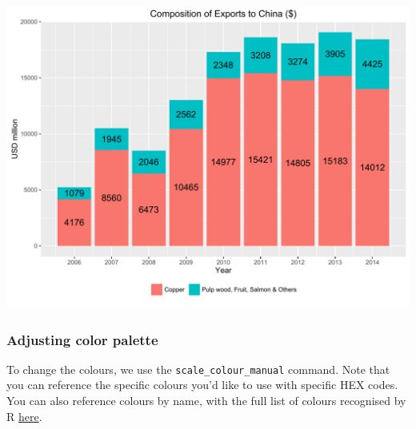 \documentclass[]{article}
\newenvironment{Shaded}{\begin{snugshade}}{\end{snugshade}}
\newcommand{\KeywordTok}[1]{\textcolor[rgb]{0.13,0.29,0.53}{\textbf{{#1}}}}
\newcommand{\DataTypeTok}[1]{\textcolor[rgb]{0.13,0.29,0.53}{{#1}}}
\newcommand{\StringTok}[1]{\textcolor[rgb]{0.31,0.60,0.02}{{#1}}}
\newcommand{\NormalTok}[1]{{#1}}
\begin{document}
\begin{center}\includegraphics{0_all_posts_pdf/bar_7-1} \end{center}

\subsubsection{Adjusting color palette}\label{adjusting-color-palette-2}

To change the colours, we use the \texttt{scale\_colour\_manual}
command. Note that you can reference the specific colours you'd like to
use with specific HEX codes. You can also reference colours by name,
with the full list of colours recognised by R
\href{http://www.stat.columbia.edu/~tzheng/files/Rcolor.pdf}{here}.

\begin{Shaded}
\end{Shaded}
\end{document}
